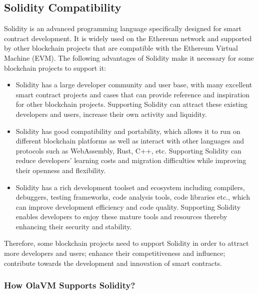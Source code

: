 \subsection{Solidity Compatibility}\label{section: solidity-compatibility}

Solidity is an advanced programming language specifically designed for smart contract development. It is widely used on the Ethereum network and supported by other blockchain projects that are compatible with the Ethereum Virtual Machine (EVM). The following advantages of Solidity make it necessary for some blockchain projects to support it:

\begin{itemize}
    \item Solidity has a large developer community and user base, with many excellent smart contract projects and cases that can provide reference and inspiration for other blockchain projects. Supporting Solidity can attract these existing developers and users, increase their own activity and liquidity.
    \item Solidity has good compatibility and portability, which allows it to run on different blockchain platforms as well as interact with other languages ​​and protocols such as WebAssembly, Rust, C++, etc. Supporting Solidity can reduce developers' learning costs and migration difficulties while improving their openness and flexibility.
    \item Solidity has a rich development toolset and ecosystem including compilers, debuggers, testing frameworks, code analysis tools, code libraries etc., which can improve development efficiency and code quality. Supporting Solidity enables developers to enjoy these mature tools and resources thereby enhancing their security and stability.
\end{itemize}

Therefore, some blockchain projects need to support Solidity in order to attract more developers and users; enhance their competitiveness and influence; contribute towards the development and innovation of smart contracts.


\subsubsection{How OlaVM Supports Solidity?}


